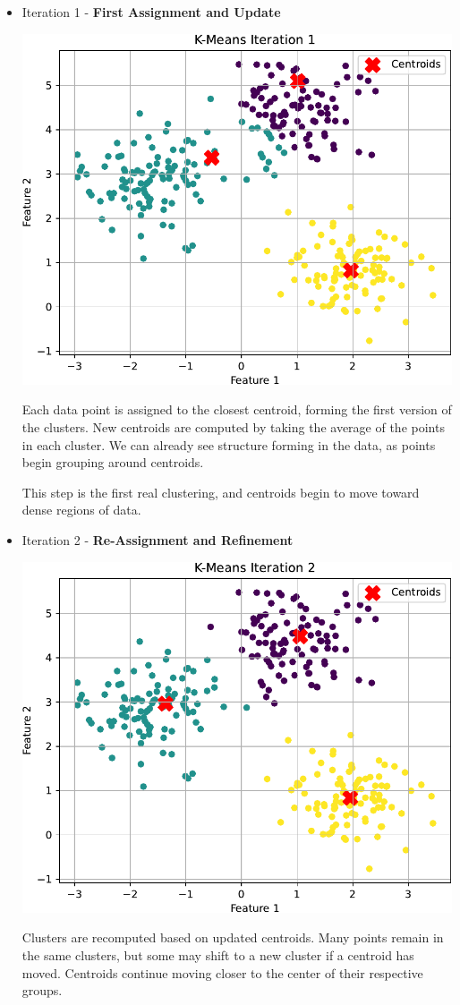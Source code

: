 \begin{itemize}
\begin{examplebox}
\begin{itemize}
            \item Iteration 1 - \textbf{First Assignment and Update}
            \begin{center}
                \includegraphics[width=.7\textwidth]{img/k-means/iter_1.pdf}
            \end{center}
            Each data point is assigned to the closest centroid, forming the first version of the clusters. New centroids are computed by taking the average of the points in each cluster. We can already see structure forming in the data, as points begin grouping around centroids.

            This step is the first real clustering, and centroids begin to move toward dense regions of data.


            \item Iteration 2 - \textbf{Re-Assignment and Refinement}
            \begin{center}
                \includegraphics[width=.7\textwidth]{img/k-means/iter_2.pdf}
            \end{center}
            Clusters are recomputed based on updated centroids. Many points remain in the same clusters, but some may shift to a new cluster if a centroid has moved. Centroids continue moving closer to the center of their respective groups.


\end{itemize}
\end{examplebox}
\end{itemize}
